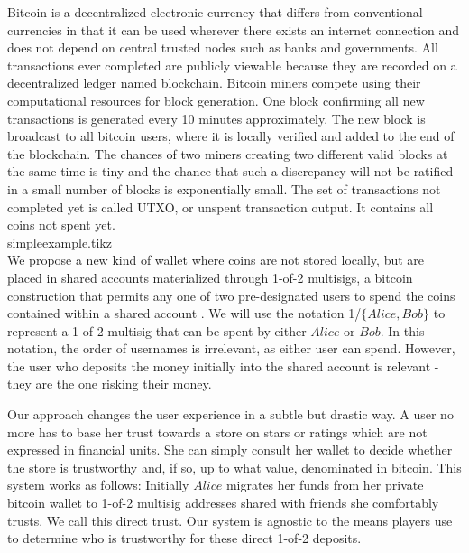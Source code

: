    Bitcoin is a decentralized electronic currency that differs from conventional currencies in that it can be used wherever
   there exists an internet connection and does not depend on central trusted nodes such as banks and governments. All
   transactions ever completed are publicly viewable because they are recorded on a decentralized ledger named blockchain.
   Bitcoin miners compete using their computational resources for block generation. One block confirming all new transactions
   is generated every 10 minutes approximately. The new block is broadcast to all bitcoin users, where it is locally
   verified and added to the end of the blockchain. The chances of two miners creating two different valid blocks at the same
   time is tiny and the chance that such a discrepancy will not be ratified in a small number of blocks is exponentially
   small. The set of transactions not completed yet is called UTXO, or unspent transaction output. It contains all coins not
   spent yet. \medskip \ \\
   {simpleexample.tikz} \smallskip \ \\
   We propose a new kind of wallet where coins are not stored locally, but are placed in shared accounts materialized through
   1-of-2 multisigs, a bitcoin construction that permits any one of two pre-designated users to spend the coins contained
   within a shared account \cite{masteringbitcoin}. We will use the notation 1/$\{Alice, Bob\}$ to represent a 1-of-2
   multisig that can be spent by either $Alice$ or $Bob$. In this notation, the order of usernames is irrelevant, as either
   user can spend. However, the user who deposits the money initially into the shared account is relevant - they are the one
   risking their money.

   Our approach changes the user experience in a subtle but drastic way. A user no more has to base her trust towards a
   store on stars or ratings which are not expressed in financial units. She can simply consult her wallet to
   decide whether the store is trustworthy and, if so, up to what value, denominated in bitcoin. This system works as follows:
   Initially $Alice$
   migrates her funds from her private bitcoin wallet to 1-of-2 multisig addresses shared with
   friends she comfortably trusts. We call this direct trust. Our system is agnostic to the means players use to determine
   who is trustworthy for these direct 1-of-2 deposits.


